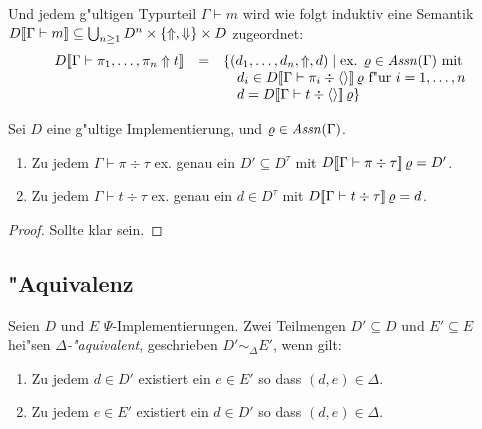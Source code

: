 \documentclass[%
  12pt,%
  a4paper,%
]{article}
\newcommand{\Tj}[3]{{#1}\vdash{#2}\div{#3}}
\begin{document}
Und jedem g"ultigen Typurteil $\Gamma \vdash m$ wird wie folgt induktiv
eine Semantik $D[\![\Gamma \vdash m]\!] \subseteq \bigcup_{n \ge 1} D^n \times \{\Uparrow,\Downarrow\} \times D$
zugeordnet:
\[\begin{array}{rcl}
  D\sem{\Gamma \vdash \pi_1,\ldots,\pi_n \Uparrow t}
  &=& \{ (d_1,\ldots,d_n,\Uparrow,d) \mid \text{ex. $\varrho \in \Assn(\Gamma)$ mit} \\
  && \quad d_i \in D\sem{\Tj{\Gamma}{\pi_i}{\langle \rangle}}\,\varrho \text{ f"ur $i=1,\ldots,n$} \\
  && \quad d = D\sem{\Tj{\Gamma}{t}{\langle \rangle}}\,\varrho \} \\
\end{array}\]

\begin{lemma} \label{lem:Wohldefiniertheit_der_Semantik}
  Sei $D$ eine g"ultige Implementierung, und $\varrho \in \mathit{Assn}(\Gamma)$.
  \begin{enumerate}
  \item Zu jedem $\Tj{\Gamma}{\pi}{\tau}$ ex. genau ein $D' \subseteq D^\tau$ mit
    $D\sem{\Tj{\Gamma}{\pi}{\tau}}\,\varrho = D'$.
  \item Zu jedem $\Tj{\Gamma}{t}{\tau}$ ex. genau ein $d \in D^\tau$ mit
    $D\sem{\Tj{\Gamma}{t}{\tau}}\,\varrho = d$.
  \end{enumerate}
\end{lemma}

\begin{proof}
  Sollte klar sein.
\end{proof}

\subsection*{"Aquivalenz}

Seien $D$ und $E$ $\Psi$-Implementierungen. Zwei Teilmengen $D' \subseteq D$ und $E' \subseteq E$
hei"sen \emph{$\Delta$-"aquivalent}, geschrieben $D' \sim_\Delta E'$, wenn gilt:
\begin{enumerate}
\item Zu jedem $d \in D'$ existiert ein $e \in E'$ so dass $(d,e) \in \Delta$.
\item Zu jedem $e \in E'$ existiert ein $d \in D'$ so dass $(d,e) \in \Delta$.
\end{enumerate}
\end{document}
